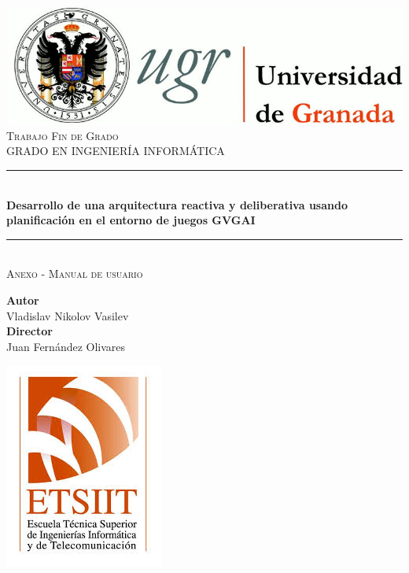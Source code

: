 \documentclass[11pt,a4paper]{article}
\newcommand{\asignatura}{Trabajo Fin de Grado}
\newcommand{\autor}{Vladislav Nikolov Vasilev}
\newcommand{\titulo}{Desarrollo de una arquitectura reactiva y deliberativa
usando planificación en el entorno de juegos GVGAI}
\newcommand{\subtitulo}{Anexo - Manual de usuario}
\newcommand{\director}{Juan Fernández Olivares}
\begin{document}

\begin{titlepage}

\begin{minipage}{\textwidth}

\centering

\includegraphics[scale=0.3]{../img/logo_ugr.jpg}\\[1cm]

\textsc{\Large \asignatura{}\\[0.2cm]}
\textsc{GRADO EN INGENIERÍA INFORMÁTICA}\\[1cm]

\noindent\rule[-1ex]{\textwidth}{1pt}\\[1.5ex]
\textbf{{\Large \titulo\\[0.5ex]}}
\noindent\rule[-1ex]{\textwidth}{3pt}\\[3.5ex]
\textsc{{\Large \subtitulo\\[0.5ex]}}

\end{minipage}

\vspace{0.7cm}

\begin{minipage}{\textwidth}

\centering

\textbf{Autor}\\ {\autor{}}\\[2.5ex]
\textbf{Director}\\ {\director}\\[2.5ex]
\vspace{0.3cm}

\includegraphics[scale=0.3]{../img/etsiit.jpeg}


\end{minipage}
\end{titlepage}
\end{document}
